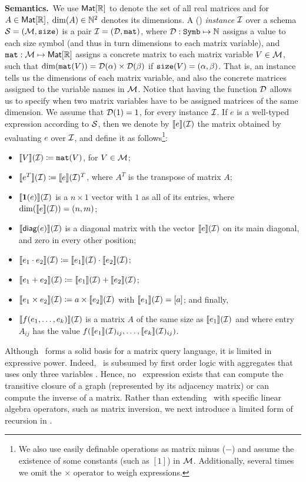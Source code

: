 \smallskip
\noindent
\textbf{Semantics.}\, We use $\textsf{Mat}[\mathbb{R}]$ to denote the set of all real matrices and for $A\in\textsf{Mat}[\mathbb{R}]$, $\dim(A)\in\mathbb{N}^2$ denotes its dimensions. A (\lang) \textit{instance} $\mathcal{I}$ over a schema $\mathcal{S}=(\mathcal{M},\texttt{size})$ is a pair $\mathcal{I} = (\mathcal{D},\texttt{mat})$, where $\mathcal{D} : \texttt{Symb} \mapsto \mathbb{N}$ assigns a value to each size symbol (and thus in turn  dimensions to each matrix variable), and $\texttt{mat} : \mathcal{M} \mapsto \textsf{Mat}[\mathbb{R}]$ assigns a concrete matrix to each matrix variable $V\in \mathcal{M}$, such that $\dim(\texttt{mat}(V)) = \mathcal{D}(\alpha)\times \mathcal{D}(\beta)$ if $\texttt{size}(V) = (\alpha,\beta)$. That is, an instance tells us the dimensions of each matrix variable, and also the concrete matrices assigned to the variable names in $\mathcal{M}$. Notice that having the function $\mathcal{D}$ allows us to specify when two matrix variables have to be assigned matrices of the same dimension. We assume that $\mathcal{D}(1) = 1$, for every instance $\mathcal{I}$. If $e$ is a well-typed expression according to $\mathcal{S}$, then we denote by $\llbracket e \rrbracket(\mathcal{I})$ the matrix obtained by evaluating $e$ over $\mathcal{I}$, and define it as follows\footnote{We also use easily definable operations as matrix minus ($-$) and assume the existence of some constants (such as $[1]$) in $\mathcal{M}$. Additionally, several times we omit the $\times$ operator to weigh expressions.}:
\begin{itemize}
\item $\llbracket V \rrbracket(\mathcal{I}) \coloneqq  \texttt{mat}(V)$, for $V\in \mathcal{M}$;
\item $\llbracket e^T \rrbracket(\mathcal{I}) \coloneqq  \llbracket e \rrbracket(\mathcal{I})^T$, where $A^T$ is the transpose of matrix $A$;
\item $\llbracket \mathbf{1}(e) \rrbracket(\mathcal{I})$ is a $n\times 1$ vector with $1$ as all of its entries, where $\dim(\llbracket e \rrbracket(\mathcal{I}))=(n,m)$;
\item $\llbracket \textsf{diag}(e) \rrbracket(\mathcal{I})$ is a diagonal matrix with the vector $\llbracket e \rrbracket(\mathcal{I})$ on its main diagonal, and zero in every other position;
\item $\llbracket e_1\cdot e_2 \rrbracket(\mathcal{I}) \coloneqq  \llbracket e_1 \rrbracket(\mathcal{I}) \cdot \llbracket e_2 \rrbracket(\mathcal{I})$;
\item $\llbracket e_1+ e_2 \rrbracket(\mathcal{I}) \coloneqq  \llbracket e_1 \rrbracket(\mathcal{I}) + \llbracket e_2 \rrbracket(\mathcal{I})$;
\item $\llbracket e_1\times e_2 \rrbracket(\mathcal{I}) \coloneqq  a\times \llbracket e_2 \rrbracket(\mathcal{I})$ with $\llbracket e_1 \rrbracket(\mathcal{I})=[a]$; and finally,
\item $\llbracket f(e_1,\ldots ,e_k) \rrbracket(\mathcal{I})$ is a matrix $A$ of the same size as $\llbracket e_1 \rrbracket(\mathcal{I})$ and where entry $A_{ij}$ has the value $f(\llbracket e_1 \rrbracket(\mathcal{I})_{ij},\ldots ,\llbracket e_k \rrbracket(\mathcal{I})_{ij})$.
\end{itemize}

\noindent
Although \lang\ forms a solid basis for a matrix query language, it is limited in expressive power. Indeed, \lang\ is subsumed by first order logic with aggregates that uses only three variables \cite{matlang-journal}. 
Hence, no \lang\ expression exists that can compute the transitive closure of a graph (represented by its adjacency matrix) or can compute the inverse of a matrix. Rather than extending \lang\ with specific linear algebra operators, such as matrix inversion, we  
next introduce a limited form of recursion in \lang.
